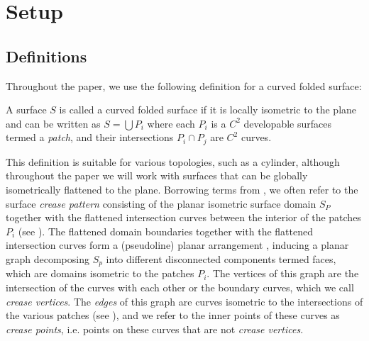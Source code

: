 \section{Setup} \label{sec:setup}
\subsection{Definitions}
Throughout the paper, we use the following definition for a curved folded surface:
\begin{definition} \label{def:curved_folded_surface}
A surface $S$ is called a curved folded surface if it is locally isometric to the plane and can be written as $S = \bigcup P_i $ where each $P_i$ is a $C^2$ developable surfaces termed a \textit{patch}, and their intersections $P_i \cap P_j$ are $C^2$ curves.
\end{definition}
This definition is suitable for various topologies, such as a cylinder, although throughout the paper we will work with surfaces that can be globally isometrically flattened to the plane. Borrowing terms from \cite{origami_book,non_pleated}, we often refer to the surface \textit{crease pattern} consisting of the planar isometric surface domain $S_P$ together with the flattened intersection curves between the interior of the patches $P_i$ (see ). The flattened domain boundaries together with the flattened intersection curves form a (pseudoline) planar arrangement \cite{arrangements}, inducing a planar graph decomposing $S_p$ into different disconnected components termed faces, which are domains isometric to the patches $P_i$. The vertices of this graph are the intersection of the curves with each other or the boundary curves, which we call \textit{crease vertices}. The \textit{edges} of this graph are curves isometric to the intersections of the various patches (see ), and we refer to the inner points of these curves as \textit{crease points}, i.e. points on these curves that are not \textit{crease vertices}.

